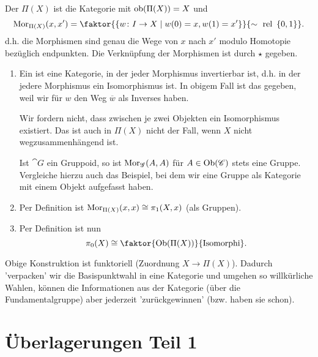 \begin{definition}[Fundamentalgruppoid]\label{def:fundamentalgruppoid}
    Der  $\Pi(X)$ ist die Kategorie mit  $\textrm{ob}(\Pi(X)) = X$ und
     \[
         \Mor_{\Pi(X)}(x,x') = \faktor{\left \{w\colon  I \to  X \mid  w(0) = x, w(1) = x'\right\}}{\sim \text{ rel } \left \{0,1\right\} }
    .\] 
    d.h. die Morphismen sind genau die Wege von $x$ nach $x'$ modulo Homotopie bezüglich endpunkten. Die Verknüpfung der Morphismen ist durch $\star$ gegeben.
\end{definition}

\begin{remark*}
    \begin{enumerate}[1)]
        \item Ein  ist eine Kategorie, in der jeder Morphismus invertierbar ist, d.h. in der jedere Morphismus ein Isomorphismus ist. In obigem Fall ist das gegeben, weil wir für $w$ den Weg $\overline{w}$ als Inverses haben.
            \begin{warning}
                Wir fordern nicht, dass zwischen je zwei Objekten ein Isomorphismus existiert. Das ist auch in $\Pi(X)$ nicht der Fall, wenn  $X$ nicht wegzusammenhängend ist.
            \end{warning}
            Ist $\cat{G}$ ein Gruppoid, so ist $\operatorname{Mor}_{\mathscr{G}}(A,A)$ für $A\in \operatorname{Ob}(\mathscr{C})$ stets eine Gruppe. Vergleiche hierzu auch das Beispiel, bei dem wir eine Gruppe als Kategorie mit einem Objekt aufgefasst haben.
        \item Per Definition ist $\operatorname{Mor}_{\Pi(X)}(x,x) \cong \pi_1(X,x)$ (als Gruppen).
        \item Per Definition ist nun
            \[
                \pi_0(X) \cong \faktor{\Ob(\Pi(X))}{\text{Isomorphi}}
            .\] 
    \end{enumerate}
\end{remark*}

\begin{oral}
    Obige Konstruktion ist funktoriell (Zuordnung $X \to  \Pi(X)$). Dadurch 'verpacken' wir die Basispunktwahl in eine Kategorie und umgehen so willkürliche Wahlen, können die Informationen aus der Kategorie (über die Fundamentalgruppe) aber jederzeit 'zurückgewinnen' (bzw. haben sie schon).
\end{oral}


\section{Überlagerungen Teil 1}

